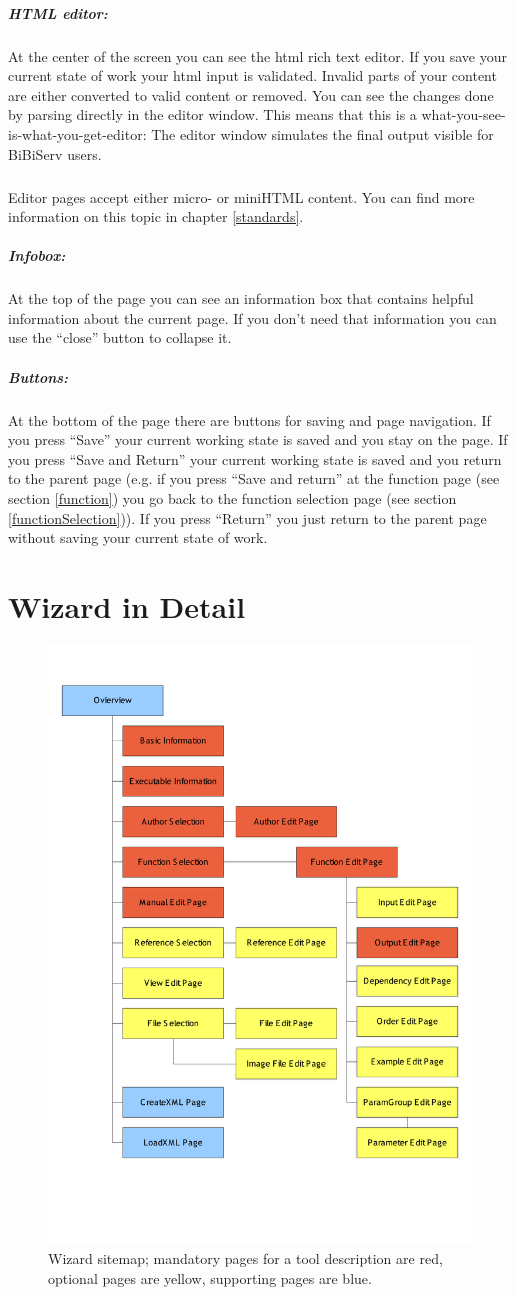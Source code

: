 \documentclass[a4paper,10pt]{book}
\newcommand{\infobox}{\paragraph{Infobox:} At the top of the page you can see an information box that contains helpful information about the current page. If you don't need that information you can use the ``close'' button to collapse it.}
\newcommand{\buttons}{\paragraph{Buttons:} At the bottom of the page there are buttons for saving and page navigation. If you press ``Save'' your current working state is saved and you stay on the page. If you press ``Save and Return'' your current working state is saved and you return to the parent page (e.g. if you press ``Save and return'' at the function page (see section \ref{function}) you go back to the function selection page (see section \ref{functionSelection})). If you press ``Return'' you just return to the parent page without saving your current state of work.}
\begin{document}
\paragraph{HTML editor:} At the center of the screen you can see the html rich text editor. If you save your current state of work your html input is validated. Invalid parts of your content are either converted to valid content or removed. You can see the changes done by parsing directly in the editor window. This means that this is a what-you-see-is-what-you-get-editor: The editor window simulates the final output visible for BiBiServ users.
\paragraph{} Editor pages accept either micro- or miniHTML content. You can find more information on this topic in chapter \ref{standards}.
\infobox
\buttons

\chapter{Wizard in Detail}
\label{single-pages}

\begin{figure}
 \includegraphics[scale=0.7]{resources/wizard_structure.pdf}
 \caption{Wizard sitemap; mandatory pages for a tool description are red, optional pages are yellow, supporting pages are blue.}
 \label{sitemap}
\end{figure}
\end{document}

